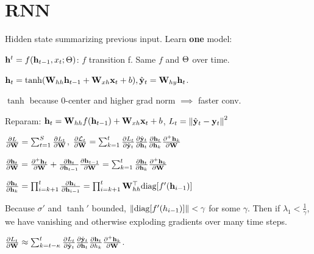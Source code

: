 \section{RNN}

Hidden state summarizing previous input. Learn \textbf{one} model:

\(\vb{h}^t = f(\vb{h}_{t-1}, x_t; \Theta)\): \(f\) transition f. Same \(f\) and \(\Theta\) over time.

\begin{definition}
    \(\vb{h}_t = \tanh(\vb{W}_{hh}\vb{h}_{t - 1} + \vb{W}_{xh}\vb{x}_t + b), \hat{\vb{y}}_t = \vb{W}_{hy} \vb{h}_t\).
    \begin{itemize*}
        \item \(\tanh\) because 0-center and higher grad norm \(\implies\) faster conv.
        \item Reparam: \(\vb{h}_t = \vb{W}_{hh} f(\vb{h}_{t-1}) + \vb{W}_{xh}\vb{x}_t + b\), \(L_t = \norm{\hat {\vb{y}}_t - \vb{y}_t}^2\)
    \end{itemize*}
\end{definition}

\begin{definition}[BPTT]
    \(\frac{\partial L}{\partial \vb{W}} = \sum_{t=1}^S \frac{\partial L_t}{\partial \vb{W}}\), 
    \(\frac{\partial \mathcal{L}_t}{\partial \vb{W}} = \sum_{k=1}^t \frac{\partial L_t}{\partial \hat{\vb{y}}_t} \frac{\partial \hat{\vb{y}}_t}{\partial \vb{h}_t} \frac{\partial \vb{h}_t}{\partial \vb{h}_k} \frac{\partial^+ \vb{h}_k}{\partial \vb{W}}\)

    \(\frac{\partial \vb{h}_t}{\partial \vb{W}} = \frac{\partial^+ \vb{h}_t}{\partial \vb{W}} + \frac{\partial \vb{h}_t}{\partial \vb{h}_{t-1}}\frac{\partial \vb{h}_{t-1}}{\partial \vb{W}} = \sum_{k=1}^t\frac{\partial \vb{h}_t}{\partial \vb{h}_k} \frac{\partial^+\vb{h}_k}{\partial \vb{W}}\)
    
    \(\frac{\partial \vb{h}_t}{\partial \vb{h}_k} = \prod_{i = k+1}^t \frac{\partial \vb{h}_i}{\partial \vb{h}_{i-1}} = \prod_{i = k+1}^t \vb{W}_{hh}^\top \text{diag}[f'(\vb{h}_{i-1})]\)
\end{definition}

\begin{definition}
    Because \(\sigma'\) and \(\tanh'\) bounded, \(\norm{\text{diag}[f'(h_{i-1})]} < \gamma\) for some \(\gamma\). Then if \(\lambda_1 < \frac{1}{\gamma}\), we have vanishing and otherwise exploding gradients over many time steps.
\end{definition}

\begin{definition}
    \(\frac{\partial L_t}{\partial \vb{W}} \approx \sum_{k = t - \kappa}^t \frac{\partial L_t}{\partial \hat{\vb{y}}_t} \frac{\partial \hat{\vb{y}}_t}{\partial \vb{h}_t}\frac{\partial \vb{h}_t}{\partial h_k}\frac{\partial^+ \vb{h}_k}{\partial \vb{W}}\).
\end{definition}

